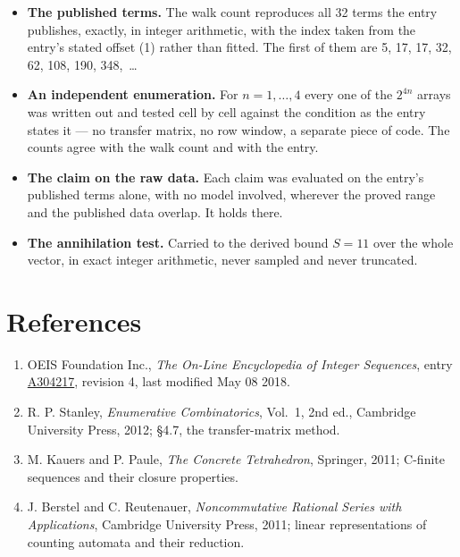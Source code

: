 \documentclass[11pt]{article}
\theoremstyle{definition}
\begin{document}
\begin{itemize}

\item {\bfseries The published terms.} The walk count reproduces all 32 terms the entry publishes, exactly, in integer arithmetic, with the index taken from the entry's stated offset (1) rather than fitted. The first of them are 5, 17, 17, 32, 62, 108, 190, 348,~\dots

\item {\bfseries An independent enumeration.} For $n = 1,\dots,4$ every one of the $2^{4n}$ arrays was written out and tested cell by cell against the condition as the entry states it --- no transfer matrix, no row window, a separate piece of code. The counts agree with the walk count and with the entry.

\item {\bfseries The claim on the raw data.} Each claim was evaluated on the entry's published terms alone, with no model involved, wherever the proved range and the published data overlap. It holds there.

\item {\bfseries The annihilation test.} Carried to the derived bound $S = 11$ over the whole vector, in exact integer arithmetic, never sampled and never truncated.

\end{itemize}

\section{References}

\begin{enumerate}

\item OEIS Foundation Inc., \emph{The On-Line Encyclopedia of Integer Sequences}, entry \href{https://oeis.org/A304217}{A304217}, revision 4, last modified May 08 2018.

\item R. P. Stanley, \emph{Enumerative Combinatorics}, Vol.~1, 2nd ed., Cambridge University Press, 2012; \S4.7, the transfer-matrix method.

\item M. Kauers and P. Paule, \emph{The Concrete Tetrahedron}, Springer, 2011; C-finite sequences and their closure properties.

\item J. Berstel and C. Reutenauer, \emph{Noncommutative Rational Series with Applications}, Cambridge University Press, 2011; linear representations of counting automata and their reduction.

\end{enumerate}
\end{document}
